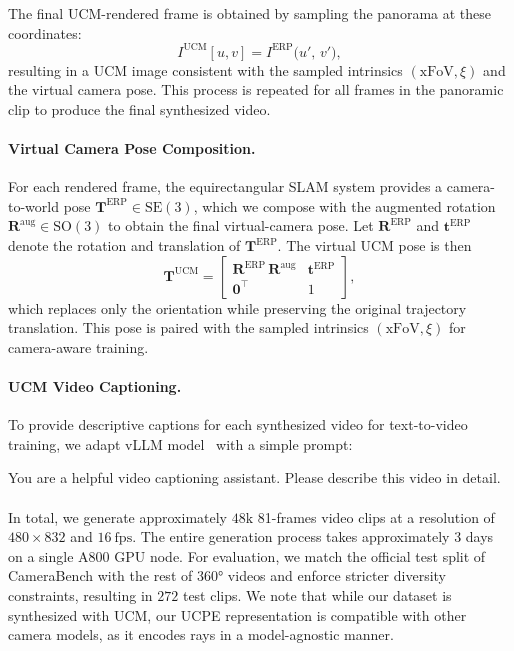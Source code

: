 The final UCM-rendered frame is obtained by sampling the panorama at these coordinates:
\begin{equation}
I^{\mathrm{UCM}}[u,v]
=
I^{\mathrm{ERP}}\!\big(u',\, v'\big),
\label{eq:erp_sample_simplified_revised}
\end{equation}
resulting in a UCM image consistent with the sampled intrinsics \((\mathrm{xFoV},\xi)\) and the virtual camera pose.
This process is repeated for all frames in the panoramic clip to produce the final synthesized video.

\paragraph{Virtual Camera Pose Composition.}
For each rendered frame, the equirectangular SLAM system provides a camera-to-world pose
\(\mathbf{T}^{\mathrm{ERP}}\in\mathrm{SE}(3)\),
which we compose with the augmented rotation
\(\mathbf{R}^{\mathrm{aug}}\in\mathrm{SO}(3)\)
to obtain the final virtual-camera pose.
Let
\(\mathbf{R}^{\mathrm{ERP}}\)
and
\(\mathbf{t}^{\mathrm{ERP}}\)
denote the rotation and translation of
\(\mathbf{T}^{\mathrm{ERP}}\).
The virtual UCM pose is then
\begin{equation}
\mathbf{T}^{\mathrm{UCM}}
=
\begin{bmatrix}
\mathbf{R}^{\mathrm{ERP}}\,\mathbf{R}^{\mathrm{aug}}
&
\mathbf{t}^{\mathrm{ERP}}
\\[2pt]
\mathbf{0}^\top & 1
\end{bmatrix},
\label{eq:ucm_pose_final}
\end{equation}
which replaces only the orientation while preserving the original trajectory
translation.
This pose is paired with the sampled intrinsics \((\mathrm{xFoV},\xi)\) for camera-aware training.

\paragraph{UCM Video Captioning.}
To provide descriptive captions for each synthesized video for text-to-video training, we adapt vLLM model~\cite{bai2025qwen2}
with a simple prompt:
\begin{PromptBox}
You are a helpful video captioning assistant.
Please describe this video in detail.
\end{PromptBox}


\paragraph{}
In total, we generate approximately \(48\mathrm{k}\) 81-frames video clips at a resolution of \(480 \times 832\) and \(16~\mathrm{fps}\). The entire generation process takes approximately 3 days on a single A800 GPU node.
For evaluation, we match the official test split of CameraBench with the rest of 360° videos and enforce stricter diversity constraints, resulting in \(272\) test clips.
We note that while our dataset is synthesized with UCM, our UCPE representation is compatible with other camera models, as it encodes rays in a model-agnostic manner.

